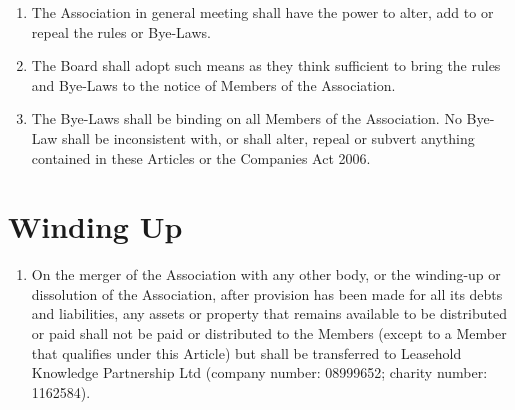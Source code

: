 \documentclass[10pt]{mk-articles-of-association}
\newcommand{\mysection}[1]{
  \end{enumerate}
  \section*{#1}
  \begin{enumerate}[resume]
}
\newcommand{\EC}[0]{Board}
\newcommand{\Exec}[0]{\EC{} }
\newcommand{\LAFA}[0]{Leasehold and Freehold Abuses}
\begin{document}
\begin{enumerate}
\begin{enumerate}
\item the arrangements for the election or appointment of members of
  the \Exec by any Councils pursuant to
  ;

\item the conduct of Members of the Association in relation to one
  another, and to the Association's employees and volunteers;

\item the procedure at general meetings and meetings of the \Exec and
  the Councils in so far as such procedure is not regulated by the
  Companies Act or by these Articles;

\item the format and contents of the Register of \LAFA, such that
  it shall provide a general means of enumerating, identifying and
  discussing \LAFA{} both within and outside the Association; \ITand

\item generally, all such matters as are commonly the subject matter
  of company rules.

\end{enumerate}

\item The Association in general meeting shall have the power to
  alter, add to or repeal the rules or Bye-Laws.

\item The \Exec shall adopt such means as they think sufficient to
  bring the rules and Bye-Laws to the notice of Members of the Association.

\item The Bye-Laws shall be binding on all Members of the
  Association. No Bye-Law shall be inconsistent with, or shall
  alter, repeal or subvert anything contained in these Articles or
  the Companies Act 2006.


\mysection{Winding Up}

\item On the merger of the Association with any other body, or the
  winding-up or dissolution of the Association, after provision has
  been made for all its debts and liabilities, any assets or property
  that remains available to be distributed or paid shall not be paid
  or distributed to the Members (except to a Member that qualifies
  under this Article) but shall be transferred to Leasehold Knowledge
  Partnership Ltd (company number: 08999652; charity number: 1162584).
\end{enumerate}
\end{document}
